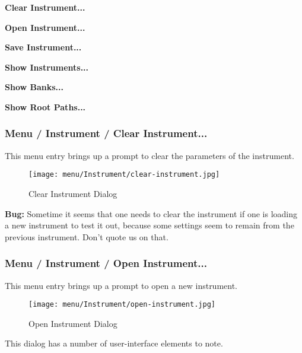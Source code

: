    \begin{enumber}
      \item \textbf{Clear Instrument...}
      \item \textbf{Open Instrument...}
      \item \textbf{Save Instrument...}
      \item \textbf{Show Instruments...}
      \item \textbf{Show Banks...}
      \item \textbf{Show Root Paths...}
   \end{enumber}

\subsubsection{Menu / Instrument / Clear Instrument...}
\label{subsubsec:menu_instrument_clear}

   This menu entry brings up a prompt to clear the parameters of the
   instrument.

\begin{figure}[H]
   \centering 
   \texttt{[image: menu/Instrument/clear-instrument.jpg]}
   \caption{Clear Instrument Dialog}
   \label{fig:clear_instrument_dialog}
\end{figure}

   \textbf{Bug:}
   Sometime it seems that one needs to clear the instrument if one is
   loading a new instrument to test it out, because some settings seem
   to remain from the previous instrument.  Don't quote us on that.

\subsubsection{Menu / Instrument / Open Instrument...}
\label{subsubsec:menu_instrument_open}

   This menu entry brings up a prompt to open a new instrument.

\begin{figure}[H]
   \centering 
   \texttt{[image: menu/Instrument/open-instrument.jpg]}
   \caption{Open Instrument Dialog}
   \label{fig:open_instrument_dialog}
\end{figure}

   This dialog has a number of user-interface elements to note.

